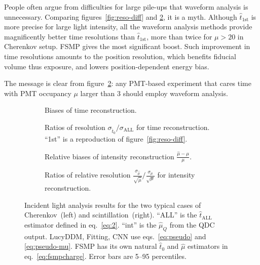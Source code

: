 People often argue from difficulties for large pile-ups that waveform analysis is unnecessary.  Comparing figures~\ref{fig:reso-diff} and \ref{fig:deltamethods}, it is a myth.  Although $\hat{t}_\mathrm{1st}$ is more precise for large light intensity, all the waveform analysis methods provide magnificently better time resolutions than $\hat{t}_\mathrm{1st}$, more than twice for $\mu>20$ in Cherenkov setup.  FSMP gives the most significant boost.  Such improvement in time resolutions amounts to the position resolution, which benefits fiducial volume thus exposure, and lowers position-dependent energy bias.

The message is clear from figure~\ref{fig:deltamethods}: any PMT-based experiment that cares time with PMT occupancy $\mu$ larger than 3 should employ waveform analysis.

\begin{figure}[H]
  \begin{subfigure}[b]{\textwidth}
    \centering
    \resizebox{\textwidth}{!}{}
    \caption{\label{fig:biasmethods} Biases of time reconstruction.}
  \end{subfigure}
  \begin{subfigure}[b]{\textwidth}
    \centering
    \resizebox{\textwidth}{!}{}
    \caption{\label{fig:deltamethods} Ratios of resolution $\sigma_{\hat{t}_0}/\sigma_{\mathrm{ALL}}$ for time reconstruction. ``1st'' is a reproduction of figure~\ref{fig:reso-diff}.}
  \end{subfigure}
  \begin{subfigure}[b]{\textwidth}
    \centering
    \resizebox{\textwidth}{!}{}
    \caption{\label{fig:biasmu} Relative biases of intensity reconstruction $\frac{\hat{\mu} - \mu}{\mu}$.}
  \end{subfigure}
  \begin{subfigure}[b]{\textwidth}
    \centering
    \resizebox{\textwidth}{!}{}
    \caption{\label{fig:deltamu} Ratios of relative resolution $\frac{\sigma_{\hat{\mu}}}{\sqrt{\hat{\mu}}}/\frac{\sigma_\mu}{\sqrt{\mu}}$ for intensity reconstruction. }
  \end{subfigure}
  \caption{Incident light analysis results for the two typical cases of Cherenkov~(left) and scintillation~(right).  ``ALL'' is the $\hat{t}_\mathrm{ALL}$ estimator defined in eq.~\eqref{eq:2}. ``int'' is the $\hat{\mu}_Q$ from the QDC output.  LucyDDM, Fitting, CNN use eqs.~\eqref{eq:pseudo} and \eqref{eq:pseudo-mu}.  FSMP has its own natural $\hat{t}_0$ and $\hat{\mu}$ estimators in eq.~\eqref{eq:fsmpcharge}. Error bars are 5--95 percentiles.}
\end{figure}

